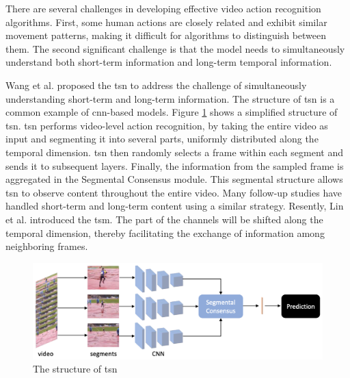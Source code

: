 There are several challenges in developing effective video action recognition algorithms. First, some human actions are closely related and exhibit similar movement patterns, making it difficult for algorithms to distinguish between them. The second significant challenge is that the model needs to simultaneously understand both short-term information and long-term temporal information. 

Wang et al. \cite{WangXW0LTG16} proposed the \gls{tsn} to address the challenge of simultaneously understanding short-term and long-term information. The structure of \gls{tsn} is a  common example of \gls{cnn}-based models. Figure \ref{fig:tsn} shows a simplified structure of \gls{tsn}. \gls{tsn} performs video-level action recognition, by taking the entire video as input and segmenting it into several parts, uniformly distributed along the temporal dimension. \gls{tsn} then randomly selects a frame within each segment and sends it to subsequent layers. Finally, the information from the sampled frame is aggregated in the Segmental Consensus module. This segmental structure allows \gls{tsn} to observe content throughout the entire video. Many follow-up studies have handled short-term and long-term content using a similar strategy. Resently, Lin et al. \cite{lin_tsm_2019} introduced the \gls{tsm}. The part of the channels will be shifted along the temporal dimension, thereby facilitating the exchange of information among neighboring frames.

\begin{figure}
    \centering
    \includegraphics[width=\textwidth]{graphics/tsn.png}
    \caption{The structure of \acrfull{tsn} \cite{zhu2020comprehensive}}
    \label{fig:tsn}
\end{figure}

